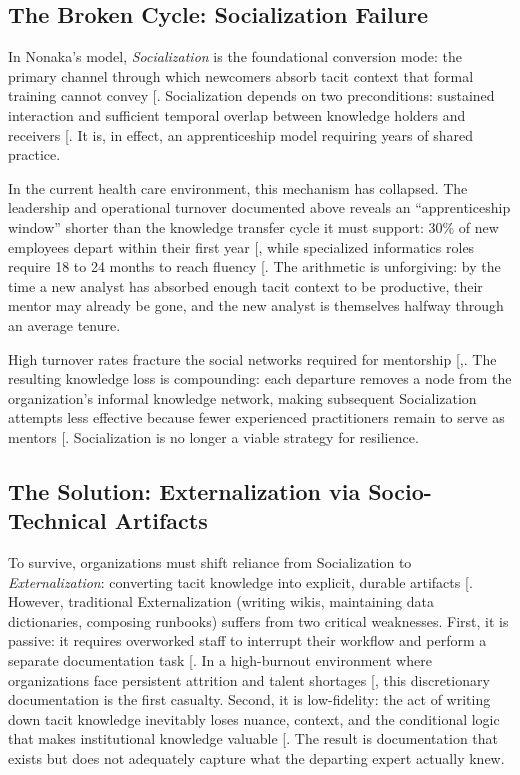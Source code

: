 \documentclass[
  american,
  11pt,
  letterpaper,
  oneside  ,captions=tableheading
]{scrartcl}
\begin{document}
\subsection{The Broken Cycle: Socialization
Failure}\label{the-broken-cycle-socialization-failure}

In Nonaka's model, \emph{Socialization} is the foundational conversion
mode: the primary channel through which newcomers absorb tacit context
that formal training cannot convey {[}\citeproc{ref-farnese2019}{20}{]}.
Socialization depends on two preconditions: sustained interaction and
sufficient temporal overlap between knowledge holders and receivers
{[}\citeproc{ref-foos2006}{22}{]}. It is, in effect, an apprenticeship
model requiring years of shared practice.

In the current health care environment, this mechanism has collapsed.
The leadership and operational turnover documented above reveals an
``apprenticeship window'' shorter than the knowledge transfer cycle it
must support: 30\% of new employees depart within their first year
{[}\citeproc{ref-nsi2025}{23}{]}, while specialized informatics roles
require 18 to 24 months to reach fluency
{[}\citeproc{ref-ledikwe2013}{17}{]}. The arithmetic is unforgiving: by
the time a new analyst has absorbed enough tacit context to be
productive, their mentor may already be gone, and the new analyst is
themselves halfway through an average tenure.

High turnover rates fracture the social networks required for mentorship
{[},\citeproc{ref-wu2024}{8}{]}. The resulting
knowledge loss is compounding: each departure removes a node from the
organization's informal knowledge network, making subsequent
Socialization attempts less effective because fewer experienced
practitioners remain to serve as mentors
{[}\citeproc{ref-massingham2018}{24}{]}. Socialization is no longer a
viable strategy for resilience.

\subsection{The Solution: Externalization via Socio-Technical
Artifacts}\label{the-solution-externalization-via-socio-technical-artifacts}

To survive, organizations must shift reliance from Socialization to
\emph{Externalization}: converting tacit knowledge into explicit,
durable artifacts {[}\citeproc{ref-zhang2025}{25}{]}. However,
traditional Externalization (writing wikis, maintaining data
dictionaries, composing runbooks) suffers from two critical weaknesses.
First, it is passive: it requires overworked staff to interrupt their
workflow and perform a separate documentation task
{[}\citeproc{ref-goffin2011}{26}{]}. In a high-burnout environment where
organizations face persistent attrition and talent shortages
{[}\citeproc{ref-himssworkforce2024}{27}{]}, this discretionary
documentation is the first casualty. Second, it is low-fidelity: the act
of writing down tacit knowledge inevitably loses nuance, context, and
the conditional logic that makes institutional knowledge valuable
{[}\citeproc{ref-foos2006}{22}{]}. The result is documentation that
exists but does not adequately capture what the departing expert
actually knew.
\end{document}
